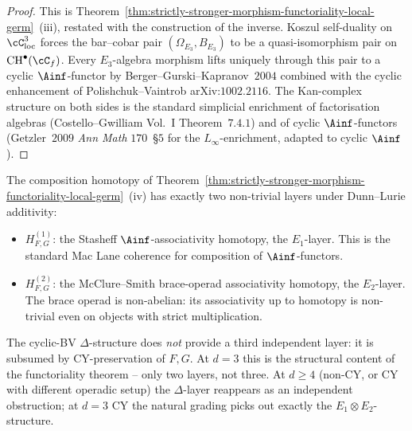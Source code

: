 \begin{proof}
This is Theorem~\ref{thm:strictly-stronger-morphism-functoriality-local-germ}~\textup{(iii)},
restated with the construction of the inverse. Koszul self-duality on
$\cC_{\mathrm{loc}}^3$ forces the bar--cobar pair
$(\Omega_{E_3}, B_{E_3})$ to be a quasi-isomorphism pair on
$\mathrm{CH}^\bullet(\cC_f)$. Every $E_3$-algebra morphism lifts
uniquely through this pair to a cyclic $\Ainf$-functor by
Berger--Gurski--Kapranov~$2004$ combined with the cyclic enhancement
of Polishchuk--Vaintrob arXiv:$1002.2116$. The Kan-complex structure
on both sides is the standard simplicial enrichment
of factorisation algebras (Costello--Gwilliam Vol.~I
Theorem~$7.4.1$) and of cyclic $\Ainf$-functors (Getzler~$2009$
\textit{Ann Math} $170$~\S$5$ for the $L_\infty$-enrichment, adapted
to cyclic $\Ainf$).
\end{proof}

\begin{remark}[Dunn--Lurie two-layer composition at \texorpdfstring{$d = 3$}{d = 3}]
\label{rem:dunn-lurie-two-layer-composition-d3}
The composition homotopy of
Theorem~\ref{thm:strictly-stronger-morphism-functoriality-local-germ}~\textup{(iv)}
has exactly two non-trivial layers under Dunn--Lurie additivity:
\begin{itemize}
 \item $H^{(1)}_{F, G}$: the Stasheff $\Ainf$-associativity homotopy,
 the $E_1$-layer. This is the standard Mac Lane coherence for
 composition of $\Ainf$-functors.
 \item $H^{(2)}_{F, G}$: the McClure--Smith brace-operad associativity
 homotopy, the $E_2$-layer. The brace operad is non-abelian:
 its associativity up to homotopy is non-trivial even on objects
 with strict multiplication.
\end{itemize}
The cyclic-BV $\Delta$-structure does \emph{not} provide a third
independent layer: it is subsumed by CY-preservation of $F, G$. At
$d = 3$ this is the structural content of the functoriality theorem
-- only two layers, not three. At $d \geq 4$ (non-CY, or CY with
different operadic setup) the $\Delta$-layer reappears as an
independent obstruction; at $d = 3$ CY the natural grading picks out
exactly the $E_1 \otimes E_2$-structure.
\end{remark}

